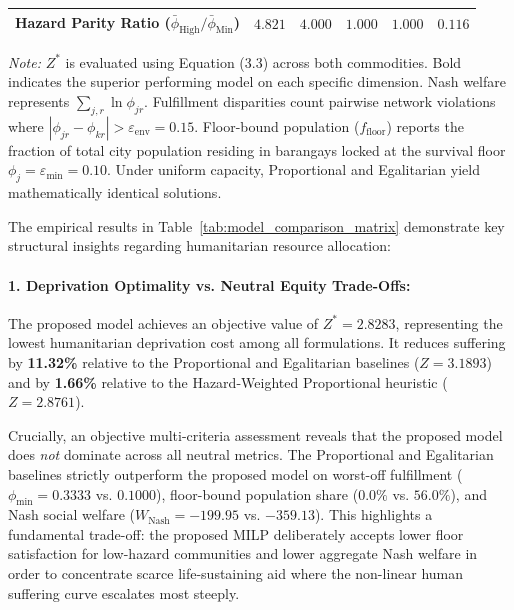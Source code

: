 \begin{table}[htbp]
{\begin{tabular}{lccccc}
Hazard Parity Ratio ($\bar{\phi}_{\text{High}} / \bar{\phi}_{\text{Min}}$) & $\mathbf{4.821}$ & $4.000$ & $1.000$ & $1.000$ & $0.116$ \\
\hline
\end{tabular}%
}
\vspace{1ex}
\parbox{\textwidth}{\footnotesize \textit{Note:} $Z^*$ is evaluated using Equation (3.3) across both commodities. Bold indicates the superior performing model on each specific dimension. Nash welfare represents $\sum_{j,r} \ln \phi_{jr}$. Fulfillment disparities count pairwise network violations where $|\phi_{jr} - \phi_{kr}| > \varepsilon_{\text{env}} = 0.15$. Floor-bound population ($f_{\text{floor}}$) reports the fraction of total city population residing in barangays locked at the survival floor $\phi_j = \varepsilon_{\min} = 0.10$. Under uniform capacity, Proportional and Egalitarian yield mathematically identical solutions.}
\end{table}

The empirical results in Table~\ref{tab:model_comparison_matrix} demonstrate key structural insights regarding humanitarian resource allocation:

\paragraph{1. Deprivation Optimality vs. Neutral Equity Trade-Offs:} The proposed model achieves an objective value of $Z^* = \mathbf{2.8283}$, representing the lowest humanitarian deprivation cost among all formulations. It reduces suffering by \textbf{11.32\%} relative to the Proportional and Egalitarian baselines ($Z = 3.1893$) and by \textbf{1.66\%} relative to the Hazard-Weighted Proportional heuristic ($Z = 2.8761$). 

Crucially, an objective multi-criteria assessment reveals that the proposed model does \textit{not} dominate across all neutral metrics. The Proportional and Egalitarian baselines strictly outperform the proposed model on worst-off fulfillment ($\phi_{\min} = 0.3333$ vs. $0.1000$), floor-bound population share ($0.0\%$ vs. $56.0\%$), and Nash social welfare ($W_{\text{Nash}} = -199.95$ vs. $-359.13$). This highlights a fundamental trade-off: the proposed MILP deliberately accepts lower floor satisfaction for low-hazard communities and lower aggregate Nash welfare in order to concentrate scarce life-sustaining aid where the non-linear human suffering curve escalates most steeply.

